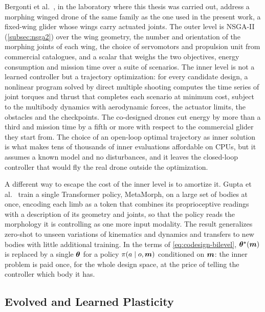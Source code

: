 Bergonti et al.\ \cite{bergonti2024codesign}, in the laboratory where this thesis was carried out, address a morphing winged drone of the same family as the one used in the present work, a fixed-wing glider whose wings carry actuated joints. The outer level is NSGA-II (\autoref{subsec:nsga2}) over the wing geometry, the number and orientation of the morphing joints of each wing, the choice of servomotors and propulsion unit from commercial catalogues, and a scalar that weighs the two objectives, energy consumption and mission time over a suite of scenarios. The inner level is not a learned controller but a trajectory optimization: for every candidate design, a nonlinear program solved by direct multiple shooting computes the time series of joint torques and thrust that completes each scenario at minimum cost, subject to the multibody dynamics with aerodynamic forces, the actuator limits, the obstacles and the checkpoints. The co-designed drones cut energy by more than a third and mission time by a fifth or more with respect to the commercial glider they start from. The choice of an open-loop optimal trajectory as inner solution is what makes tens of thousands of inner evaluations affordable on CPUs, but it assumes a known model and no disturbances, and it leaves the closed-loop controller that would fly the real drone outside the optimization.

A different way to escape the cost of the inner level is to amortize it. Gupta et al.\ \cite{gupta2022metamorph} train a single Transformer policy, MetaMorph, on a large set of bodies at once, encoding each limb as a token that combines its proprioceptive readings with a description of its geometry and joints, so that the policy reads the morphology it is controlling as one more input modality. The result generalizes zero-shot to unseen variations of kinematics and dynamics and transfers to new bodies with little additional training. In the terms of \eqref{eq:codesign-bilevel}, $\bm{\theta}^{\star}(\bm{m})$ is replaced by a single $\bm{\theta}$ for a policy $\pi(a \mid o, \bm{m})$ conditioned on $\bm{m}$: the inner problem is paid once, for the whole design space, at the price of telling the controller which body it has.

\subsection{Evolved and Learned Plasticity}
\label{subsec:rw-plasticity}

